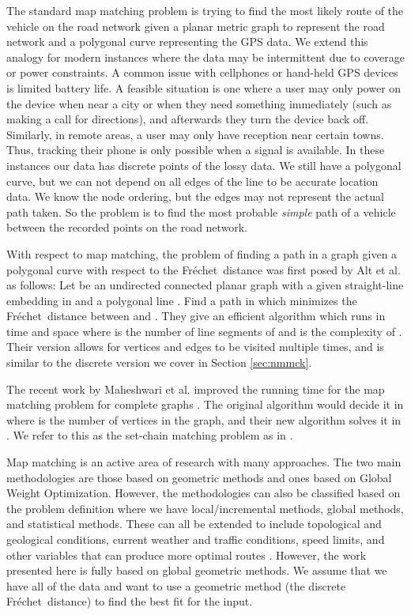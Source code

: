 \documentclass{article}[11pt]
\newcommand{\frechet}{Fr\'echet}
\newcommand{\dfd}{discrete \frechet\ distance}
\begin{document}
The standard map matching problem is trying to find the most likely route of the vehicle on 
the road network given a planar metric graph to represent the road network and a polygonal curve 
representing the GPS data.
We extend this analogy for modern instances where the data may be intermittent due to 
coverage or power constraints.  A common issue with cellphones or hand-held GPS devices is 
limited battery life.  A feasible situation is one where a user may only power on the 
device when near a city or when they need something immediately (such as making a call 
for directions), and afterwards they turn the device back off.  
Similarly, in remote areas, a user may only have reception near certain towns.  
Thus, tracking their phone is only possible when a signal is available.
In these instances our data has discrete points of the lossy data.
We still have a polygonal curve,
but we can not depend on all edges of the line to be accurate location data.
We know the node ordering, but the edges may not represent the actual path taken.
So the problem is to find the most probable \emph{simple} path of a vehicle 
between the recorded points on the road network.


With respect to map matching, the problem of finding a path in a graph given a polygonal 
curve with respect to the \frechet\ distance was first posed by Alt et al. \cite{Alt:2003:JALGS}
as follows: Let  be an undirected connected planar graph with a given straight-line
embedding in  and a polygonal line . Find a path  in  which minimizes
the \frechet\ distance between  and . They give an efficient algorithm which runs in
 time and  space where  is the number of line segments of  and  is the
complexity of . Their version allows for vertices and edges to be visited multiple times,
and is similar to the discrete version we cover in Section \ref{sec:nmmck}. 


The recent work by Maheshwari et al. improved the running time for the 
map matching problem for complete graphs \cite{Maheshwari:2011:CCCG}.
The original algorithm would decide it in  where  is the number of vertices
in the graph, and their new algorithm solves it in .  
We refer to this as the set-chain matching problem as in \cite{Wylie:2014:TCS}. 

Map matching is an active area of research with many approaches.  The two main 
methodologies are those based on geometric methods and ones based on Global Weight Optimization.
However, the methodologies can also be classified based on the problem definition where
we have local/incremental methods, global methods, and statistical methods.
These can all be extended to include topological and geological conditions, 
current weather and traffic conditions, speed limits, and other variables that can 
produce more optimal routes \cite{Lou:2009:GIS,Wei:2013:TECH}. However, the work presented here is fully based on global geometric methods. 
We assume that we have all of the data and want to use a geometric method (the \dfd ) 
to find the best fit for the input.
\end{document}
